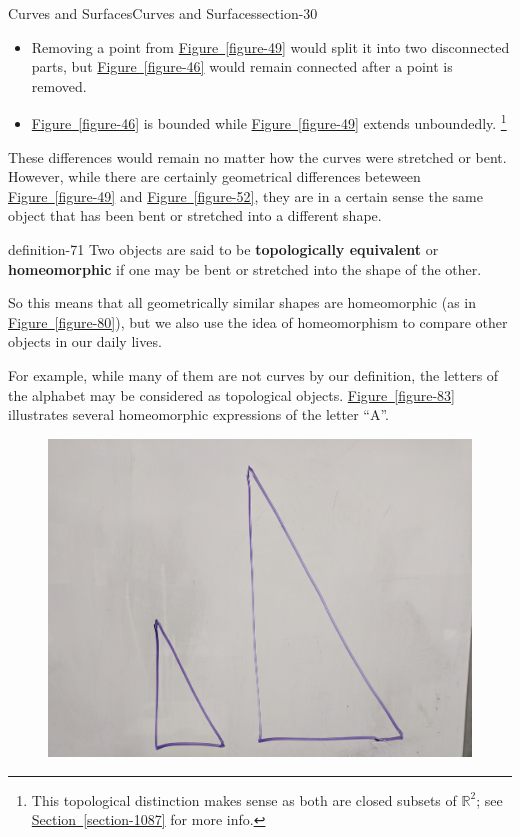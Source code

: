 \documentclass[oneside,10pt,]{article}
\newcommand{\terminology}[1]{\textbf{#1}}
\begin{document}
\begin{sectionptx}{Curves and Surfaces}{}{Curves and Surfaces}{}{}{section-30}
\begin{itemize}[label=\textbullet]
\item{}Removing a point from \hyperref[figure-49]{Figure~\ref{figure-49}} would split it into two disconnected parts, but \hyperref[figure-46]{Figure~\ref{figure-46}} would remain connected after a point is removed.%
\item{}\hyperref[figure-46]{Figure~\ref{figure-46}} is bounded while \hyperref[figure-49]{Figure~\ref{figure-49}} extends unboundedly. \footnote{This topological distinction makes sense as both are closed subsets of \(\mathbb R^2\); see \hyperref[section-1087]{Section~\ref{section-1087}} for more info.\label{fn-65}}%
\end{itemize}
\hypertarget{p-68}{}%
These differences would remain no matter how the curves were stretched or bent. However, while there are certainly geometrical differences beteween \hyperref[figure-49]{Figure~\ref{figure-49}} and \hyperref[figure-52]{Figure~\ref{figure-52}}, they are in a certain sense the same object that has been bent or stretched into a different shape.%
\begin{definition}{}{definition-71}%
\hypertarget{p-72}{}%
Two objects are said to be \terminology{topologically equivalent} or \terminology{homeomorphic} if one may be bent or stretched into the shape of the other.%
\end{definition}
\hypertarget{p-75}{}%
So this means that all geometrically similar shapes are homeomorphic (as in \hyperref[figure-80]{Figure~\ref{figure-80}}), but we also use the idea of homeomorphism to compare other objects in our daily lives.%
\par
\hypertarget{p-77}{}%
For example, while many of them are not curves by our definition, the letters of the alphabet may be considered as topological objects. \hyperref[figure-83]{Figure~\ref{figure-83}} illustrates several homeomorphic expressions of the letter ``A''.%
\begin{figure}
\centering
\includegraphics[width=1\linewidth]{images/similar-triangles.jpg}

\end{figure}
\end{sectionptx}
\end{document}
